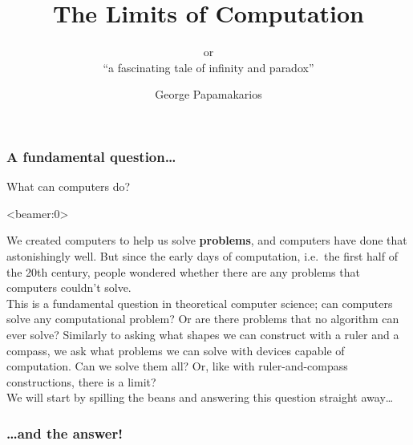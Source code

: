 \documentclass[handout, 12pt]{beamer}
\title{The Limits of Computation}
\subtitle{or\\``a fascinating tale of infinity and paradox''}
\author{George Papamakarios}
\date{}
\begin{document}
\frame{\titlepage}

\begin{frame}

\frametitle{A fundamental question\ldots}

\centering
{\Large What can computers do?}

\end{frame}

\begin{frame}<beamer:0>

\footnotesize
We created computers to help us solve \textbf{problems}, and computers have done that astonishingly well. But since the early days of computation, i.e.~the first half of the 20th century, people wondered whether there are any problems that computers couldn't solve.
\\[0.6em]
This is a fundamental question in theoretical computer science; can computers solve any computational problem? Or are there problems that no algorithm can ever solve? Similarly to asking what shapes we can construct with a ruler and a compass, we ask what problems we can solve with devices capable of computation. Can we solve them all? Or, like with ruler-and-compass constructions, there is a limit?
\\[0.6em]
We will start by spilling the beans and answering this question straight away\ldots

\end{frame}

\begin{frame}

\frametitle{\ldots and the answer!}

\begin{block}{}
\centering
\color{r}{\LARGE There exist problems that no algorithm can solve!}
\end{block}

\pause

\begin{block}{}
\centering
{}
\end{block}

\end{frame}
\end{document}
